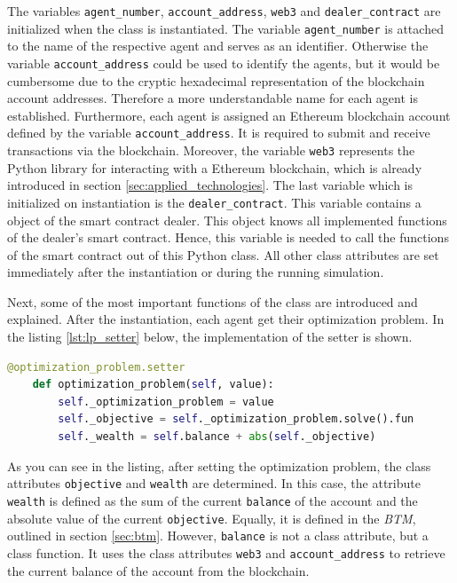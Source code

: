 The variables \verb|agent_number|, \verb|account_address|, \verb|web3| and \verb|dealer_contract| are initialized when the class is instantiated.
The variable \verb|agent_number| is attached to the name of the respective agent and serves as an identifier. 
Otherwise the variable \verb|account_address| could be used to identify the agents, 
but it would be cumbersome due to the cryptic hexadecimal representation of the blockchain account addresses.
Therefore a more understandable name for each agent is established.
Furthermore, each agent is assigned an Ethereum blockchain account defined by the variable \verb|account_address|. It is required to submit and 
receive transactions via the blockchain.
Moreover, the variable \verb|web3| represents the Python library for interacting with a Ethereum blockchain, which is already introduced in section \ref{sec:applied_technologies}.
The last variable which is initialized on instantiation is the \verb|dealer_contract|. 
This variable contains a object of the smart contract dealer. This object knows all implemented functions of the dealer's smart contract.
Hence, this variable is needed to call the functions of the smart contract out of this Python class.
All other class attributes are set immediately after the instantiation or during the running simulation. 

Next, some of the most important functions of the class are introduced and explained.
After the instantiation, each agent get their optimization problem. In the listing \ref{lst:lp_setter} below, the implementation 
of the setter is shown.

\begin{lstlisting}[label=lst:lp_setter, caption=Setter of optimization problem, language=Python]
    @optimization_problem.setter
    def optimization_problem(self, value):
        self._optimization_problem = value
        self._objective = self._optimization_problem.solve().fun
        self._wealth = self.balance + abs(self._objective)
\end{lstlisting}

As you can see in the listing, after setting the optimization problem, the class attributes \verb|objective| and \verb|wealth| are determined.
In this case, the attribute \verb|wealth| is defined as the sum of the current \verb|balance| of the account and the absolute value of the current \verb|objective|.
Equally, it is defined in the \textit{BTM}, outlined in section \ref{sec:btm}.
However, \verb|balance| is not a class attribute, but a class function. It uses the class attributes \verb|web3| and \verb|account_address| to retrieve the current
balance of the account from the blockchain.

